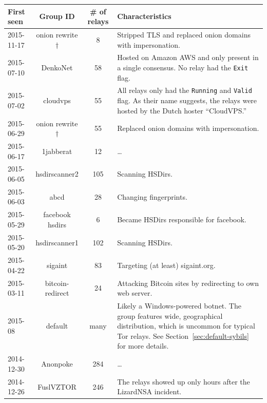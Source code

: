 \begin{table}[t]
\centering
\begin{tabular}{l c c p{10cm}}
\textbf{First seen} & \textbf{Group ID} & \textbf{\# of relays} & \textbf{Characteristics} \\
\hline
2015-11-17 & onion rewrite$\dagger$ & 8 & Stripped TLS and replaced onion
domains with impersonation. \\

2015-07-10 & DenkoNet & 58 & Hosted on Amazon AWS and only present in a single
consensus.  No relay had the \texttt{Exit} flag. \\

2015-07-02 & cloudvps & 55 & All relays only had the \texttt{Running} and
\texttt{Valid} flag.  As their name suggests, the relays were hosted by
the Dutch hoster ``CloudVPS.'' \\

2015-06-29 & onion rewrite$\dagger$ & 55 & Replaced onion domains with
impersonation. \\

2015-06-17 & 1jabberat & 12 & \ldots \\

2015-06-05 & hsdirscanner2 & 105 & Scanning HSDirs. \\

2015-06-03 & abcd & 28 & Changing fingerprints. \\

2015-05-29 & facebook hsdirs & 6 & Became HSDirs responsible for facebook.  \\

2015-05-20 & hsdirscanner1 & 102 & Scanning HSDirs. \\

2015-04-22 & sigaint & 83 & Targeting (at least) sigaint.org. \\

2015-03-11 & bitcoin-redirect & 24 & Attacking Bitcoin sites by redirecting to own web server. \\

2015-08 & default & many & Likely a Windows-powered botnet.  The group
features wide, geographical distribution, which is uncommon for typical Tor
relays. See Section~\ref{sec:default-sybils} for more details. \\

2014-12-30 & Anonpoke & 284 & \ldots\\

2014-12-26 & FuslVZTOR & 246 & The relays showed up only hours after the
LizardNSA incident. \\


\end{tabular}
\end{table}
